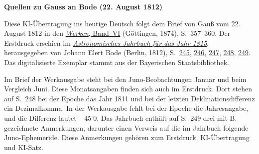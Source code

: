 \clearpage\thispagestyle{empty}
\begin{center}\textbf{Quellen zu Gauss an Bode (22. August 1812)}\end{center}
\noindent Diese KI-Übertragung ins heutige Deutsch folgt dem Brief von Gauß vom 22. August 1812 in den \href{https://gdz.sub.uni-goettingen.de/id/PPN236007467}{\textit{Werken}, Band~VI} (Göttingen, 1874), S.~357--360. Der Erstdruck erschien im \href{https://api.digitale-sammlungen.de/iiif/image/v2/bsb10538344_00005/full/1600,/0/default.jpg}{\textit{Astronomisches Jahrbuch für das Jahr 1815}}, herausgegeben von Johann Elert Bode (Berlin, 1812), S.~\href{https://api.digitale-sammlungen.de/iiif/image/v2/bsb10538344_00253/full/1600,/0/default.jpg}{245}, \href{https://api.digitale-sammlungen.de/iiif/image/v2/bsb10538344_00254/full/1600,/0/default.jpg}{246}, \href{https://api.digitale-sammlungen.de/iiif/image/v2/bsb10538344_00255/full/1600,/0/default.jpg}{247}, \href{https://api.digitale-sammlungen.de/iiif/image/v2/bsb10538344_00256/full/1600,/0/default.jpg}{248}, \href{https://api.digitale-sammlungen.de/iiif/image/v2/bsb10538344_00257/full/1600,/0/default.jpg}{249}. Das digitalisierte Exemplar stammt aus der Bayerischen Staatsbibliothek.
\par\smallskip\noindent Im Brief der Werkausgabe steht bei den Juno-Beobachtungen Januar und beim Vergleich Juni. Diese Monatsangaben finden sich auch im Erstdruck. Dort stehen auf S.~248 bei der Epoche das Jahr 1811 und bei der letzten Deklinationsdifferenz ein Dezimalkomma. In der Werkausgabe fehlt bei der Epoche die Jahresangabe, und die Differenz lautet $-45\;0$. Das Jahrbuch enthält auf S.~249 drei mit B. gezeichnete Anmerkungen, darunter einen Verweis auf die im Jahrbuch folgende Juno-Ephemeride. Diese Anmerkungen gehören zum Erstdruck. KI-Übertragung und KI-Satz.
\clearpage
